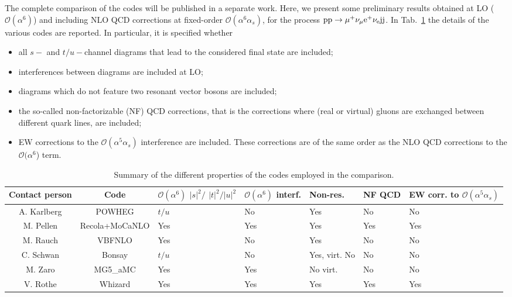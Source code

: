 The complete comparison of the codes will be published in a separate work. Here, we present some preliminary results obtained at LO ($\mathcal O (\alpha^6)$) and including
NLO QCD corrections at fixed-order $\mathcal O (\alpha^6\alpha_s)$, for the process ${\rm p}{\rm p}\to\mu^+\nu_\mu{\rm e}^+\nu_{\rm e}{\rm j}{\rm j}$.
In Tab.~\ref{tab:wg1_codes} the details of the various codes are reported. In particular, it is specified whether
\begin{itemize}
    \item all $s-$ and $t/u-$channel diagrams that lead to the considered final state are included;
    \item interferences between diagrams are included at LO;
    \item diagrams which do not feature two resonant vector bosons are included;
    \item the so-called non-factorizable (NF) QCD corrections, that is the corrections where (real or virtual) gluons are exchanged between different quark lines,
        are included;
    \item EW corrections to the $\mathcal O (\alpha^5\alpha_s)$ interference are included. These corrections are of the same order as the NLO QCD corrections to
        the  $\mathcal O (\alpha^6$) term.
\end{itemize}
%
\begin{table}
    \footnotesize
    \begin{tabularx}{\textwidth}{c|c|X|X|X|X|X}
        Contact person  &  Code  &  $\mathcal O(\alpha^6)$ $|s|^2/$ $|t|^2/|u|^2$  &  $\mathcal O(\alpha^6)$ interf.  &  Non-res.  &  NF QCD  &  EW corr. to $\mathcal O(\alpha^5\alpha_s)$  \\
        \hline
        \hline
        A. Karlberg  &  {\sc POWHEG}  &  $t/u$  &  No  &  Yes  &  No  &  No  \\
        M. Pellen    &  {\sc Recola+MoCaNLO}  &  Yes  &  Yes  &  Yes  &  Yes  &  Yes  \\
        M. Rauch     &  {\sc VBFNLO}  &  Yes  &  No  &  Yes  &  No  &  No  \\
        C. Schwan    &  {\sc Bonsay}  &  $t/u$  &  No  &  Yes, virt. No  &  No  &  No  \\
        M. Zaro      &  {\sc MG5\_aMC}  &  Yes  &  Yes  &  No virt.  &  No  &  No \\
        V. Rothe     &  {\sc Whizard}  &  Yes  &  Yes  &  Yes  &  Yes  &  Yes \\  
    \end{tabularx}
    \caption{\label{tab:wg1_codes} Summary of the different properties of the codes employed in the comparison.}
\end{table}
%
